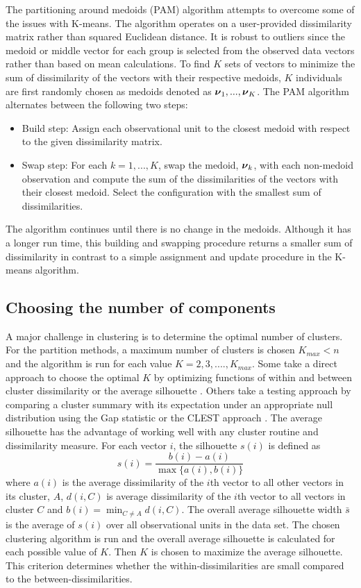 The partitioning around medoids (PAM) algorithm attempts to overcome some of the issues with K-means. The algorithm operates on a user-provided dissimilarity matrix rather than squared Euclidean distance. It is robust to outliers since the medoid or middle vector for each group is selected from the observed data vectors rather than based on mean calculations. To find $K$ sets of vectors to minimize the sum of dissimilarity of the vectors with their respective medoids, $K$ individuals are first randomly chosen as medoids denoted as $\boldsymbol \nu_{1},...,\boldsymbol \nu_{K}$. The PAM algorithm alternates between the following two steps:
 \begin{itemize}
\item Build step: Assign each observational unit to the closest medoid with respect to the given dissimilarity matrix.
\item Swap step: For each $k=1,...,K$, swap the medoid, $\boldsymbol\nu_{k}$, with each non-medoid observation and compute the sum of the dissimilarities of the vectors with their closest medoid. Select the configuration with the smallest sum of dissimilarities.
\end{itemize}
The algorithm continues until there is no change in the medoids. Although it has a longer run time, this building and swapping procedure returns a smaller sum of dissimilarity in contrast to a simple assignment and update procedure in the K-means algorithm. 

\subsection{Choosing the number of components}
A major challenge in clustering is to determine the optimal number of clusters. For the partition methods, a maximum number of clusters is chosen $K_{max}<n$ and the algorithm is run for each value $K=2,3,....,K_{max}$. Some take a direct approach to choose the optimal $K$  by optimizing functions of within and between cluster dissimilarity \cite{mulligan1985} or the average silhouette \cite{kaufman1990}. Others take a testing approach by comparing a cluster summary with its expectation under an appropriate null distribution using the Gap statistic \cite{tibshirani2001} or the CLEST approach \cite{dudoit2002}. The average silhouette has the advantage of working well with any cluster routine and dissimilarity measure. For each vector $i$, the silhouette $s(i)$ is defined as
$$s(i)=\frac{b(i)-a(i)}{\max\{a(i),b(i)\}}$$
where $a(i)$ is the average dissimilarity of the $i$th vector to all other vectors in its cluster, $A$, $d(i,C)$ is average dissimilarity of the $i$th vector to all vectors in cluster $C$ and $b(i)=\min_{C\not= A} d(i,C)$. The overall average silhouette width $\bar{s}$ is the average of $s(i)$ over all observational units in the data set. The chosen clustering algorithm is run and the overall average silhouette is calculated for each possible value of $K$. Then $K$ is chosen to maximize the average silhouette. This criterion determines whether the within-dissimilarities are small compared to the between-dissimilarities. 

